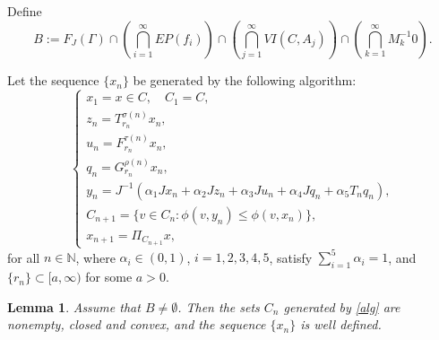 \documentclass[leqno,12pt]{amsart}
\newtheorem{lemma}[theorem]{Lemma}
\theoremstyle{definition}
\numberwithin{equation}{section}
\begin{document}
Define
\begin{equation}\label{Bset}
B:=F_J(\Gamma)\cap\left(\bigcap_{i=1}^{\infty}EP(f_i)\right)
\cap\left(\bigcap_{j=1}^{\infty}VI(C,A_j)\right)
\cap\left(\bigcap_{k=1}^{\infty}M_k^{-1}0\right).
\end{equation}

Let the sequence $\{x_n\}$ be generated by the following algorithm:
\begin{equation}\label{alg}
\left\{
\begin{array}{ll}
x_1=x\in C,\quad C_1=C,\\[0.1cm]
z_n=T_{r_n}^{\sigma(n)}x_n,\\[0.1cm]
u_n=F_{r_n}^{\tau(n)}x_n,\\[0.1cm]
q_n=G_{r_n}^{\rho(n)}x_n,\\[0.1cm]
y_n=J^{-1}\left(\alpha_1Jx_n+\alpha_2Jz_n+\alpha_3Ju_n+\alpha_4Jq_n+\alpha_5T_nq_n\right),\\[0.1cm]
C_{n+1}=\{v\in C_n:\phi(v,y_n)\leq \phi(v,x_n)\},\\[0.1cm]
x_{n+1}=\Pi_{C_{n+1}}x,
\end{array}
\right.
\end{equation}
for all $n\in\mathbb{N}$, where $\alpha_i\in(0,1)$, $i=1,2,3,4,5$, satisfy $\sum_{i=1}^{5}\alpha_i=1$, and $\{r_n\}\subset[a,\infty)$ for some $a>0$.

\begin{lemma}\label{welldefined}
Assume that $B\neq\emptyset$. Then the sets $C_n$ generated by \eqref{alg} are nonempty, closed and convex, and the sequence $\{x_n\}$ is well defined.
\end{lemma}
\end{document}
